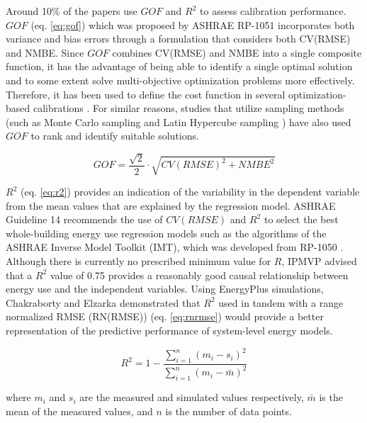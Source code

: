 \documentclass[review]{elsarticle}
\begin{document}
Around 10\% of the papers use $GOF$ and $R^2$ to assess calibration performance. $GOF$ (eq. \ref{eq:gof}) which was proposed by ASHRAE RP-1051 \cite{reddy2007calibrating} incorporates both variance and bias errors through a formulation that considers both CV(RMSE) and NMBE. Since $GOF$ combines CV(RMSE) and NMBE into a single composite function, it has the advantage of being able to identify a single optimal solution and to some extent solve multi-objective optimization problems more effectively. Therefore, it has been used to define the cost function in several optimization-based calibrations \cite{nagpal2019framework, figueiredo2018comparison, ramosruiz2016genetic, ramosruiz2017analysis, nagpal2019framework, larochellemartin2019energy}. For similar reasons, studies that utilize sampling methods (such as Monte Carlo sampling \cite{chen2020automatic} and Latin Hypercube sampling \cite{harmer2015using, cipriano2015evaluation, sakiyama2020natural}) have also used $GOF$ to rank and identify suitable solutions. 

\begin{equation}\label{eq:gof}
GOF = \frac{\sqrt{2}}{2} \cdot \sqrt{CV(RMSE)^2 + NMBE^2}
\end{equation}

$R^2$ (eq. \ref{eq:r2}) provides an indication of the variability in the dependent variable from the mean values that are explained by the regression model. ASHRAE Guideline 14 \cite{ashrae2014guideline} recommends the use of $CV(RMSE)$ and $R^2$ to select the best whole-building energy use regression models such as the algorithms of the ASHRAE Inverse Model Toolkit (IMT), which was developed from RP-1050 \cite{kissock2003inverse, haberl2003inverse}. Although there is currently no prescribed minimum value for $R$, IPMVP \cite{evo2019uncertainty} advised that a $R^2$ value of 0.75 provides a reasonably good causal relationship between energy use and the independent variables. Using EnergyPlus simulations, Chakraborty and Elzarka \cite{chakraborty2017performance} demonstrated that $R^2$ used in tandem with a range normalized RMSE (RN(RMSE)) (eq. \ref{eq:rnrmse}) would provide a better representation of the predictive performance of system-level energy models. 

\begin{equation}\label{eq:r2}
R^2 = 1 - \frac{\sum_{i=1}^n (m_i - s_i)^2}{\sum_{i=1}^n (m_i - \bar{m})^2}
\end{equation}

\noindent where $m_i$ and $s_i$ are the measured and simulated values respectively, $\bar{m}$ is the mean of the measured values, and $n$ is the number of data points.
\end{document}
